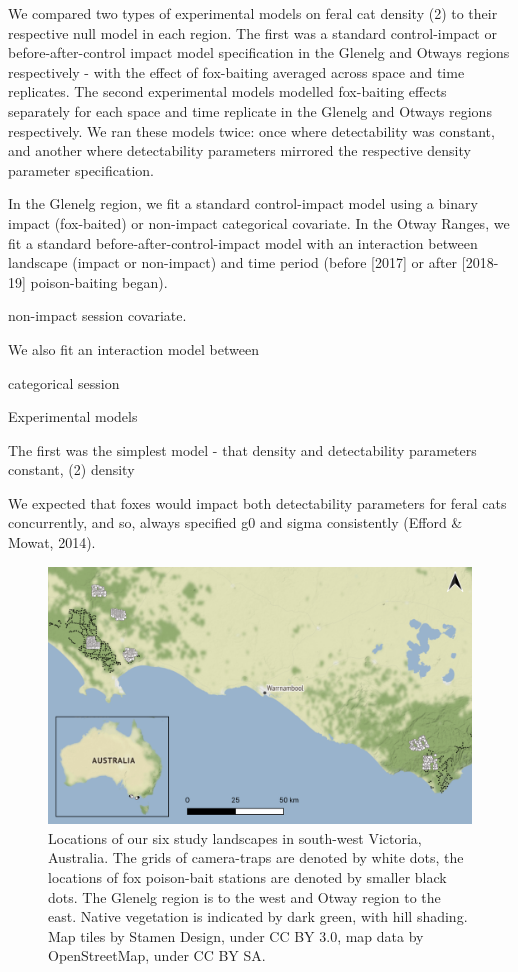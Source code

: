 \documentclass[]{elsarticle} %
\begin{document}
We compared two types of experimental models on feral cat density (2) to their respective null model in each region. The first was a standard control-impact or before-after-control impact model specification in the Glenelg and Otways regions respectively - with the effect of fox-baiting averaged across space and time replicates. The second experimental models modelled fox-baiting effects separately for each space and time replicate in the Glenelg and Otways regions respectively. We ran these models twice: once where detectability was constant, and another where detectability parameters mirrored the respective density parameter specification.

In the Glenelg region, we fit a standard control-impact model using a binary impact (fox-baited) or non-impact categorical covariate. In the Otway Ranges, we fit a standard before-after-control-impact model with an interaction between landscape (impact or non-impact) and time period (before {[}2017{]} or after {[}2018-19{]} poison-baiting began).

non-impact session covariate.

We also fit an interaction model between

categorical session

Experimental models

The first was the simplest model - that density and detectability parameters constant, (2) density

We expected that foxes would impact both detectability parameters for feral cats concurrently, and so, always specified g0 and sigma consistently (Efford \& Mowat, 2014).

\begin{figure}
\includegraphics[width=1\linewidth]{figs/fig1} \caption{Locations of our six study landscapes in south-west Victoria, Australia. The grids of camera-traps are denoted by white dots, the locations of fox poison-bait stations are denoted by smaller black dots. The Glenelg region is to the west and Otway region to the east. Native vegetation is indicated by dark green, with hill shading. Map tiles by Stamen Design, under CC BY 3.0, map data by OpenStreetMap, under CC BY SA.}\label{fig:map}
\end{figure}
\end{document}
